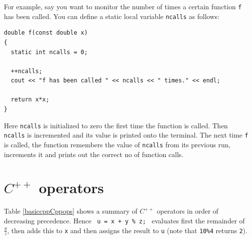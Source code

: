 For example, say you want to monitor the number of times a certain function
\verb+f+ has been called. You can define a static local variable \verb+ncalls+
as follows:
{\small \begin{verbatim}
double f(const double x)
{
  static int ncalls = 0;

  ++ncalls;
  cout << "f has been called " << ncalls << " times." << endl;

  return x*x;
}
\end{verbatim}}
\noindent
Here \verb+ncalls+ is initialized to zero the first time the function is called.
Then \verb+ncalls+ is incremented and its value is printed onto the terminal.
The next time \verb+f+ is called, the function remembers the value of
\verb+ncalls+ from its previous run, increments it and prints out the correct
no of function calls.


\section{$C^{++}$ operators}

Table \ref{basiccppCppops} shows a summary of $C^{++}$ operators
 in order of decreasing precedence. Hence
\verb& u = x + y % z; & evaluates first the remainder of $\frac{y}{z}$,
then adds this to \verb+x+ and then assigns the result to \verb+u+
(note that \verb+10%4+ returns \verb+2+).


